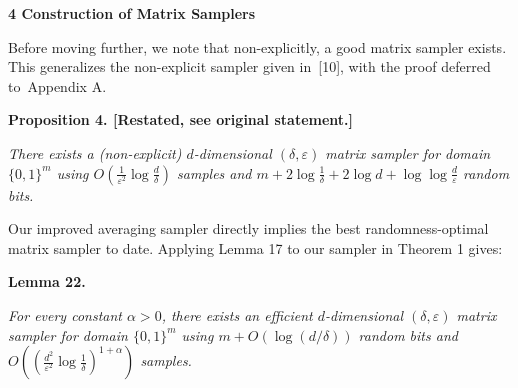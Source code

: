 \documentclass[10pt,a4paper]{article}
\begin{document}






\par\medskip\noindent\textbf{
4 Construction of Matrix Samplers}\par




Before moving further, we note that non-explicitly,
a good matrix sampler exists.
This generalizes the non-explicit sampler given in [10], with the proof deferred to Appendix A.\par






\par\medskip\noindent\textbf{
\textbf{Proposition 4}\textbf{.}
[Restated, see original statement.]}\par



\emph{There exists a (non-explicit) $d$-dimensional $(\delta,\varepsilon)$ matrix sampler for domain $\{0,1\}^{m}$ using $O(\frac{1}{\varepsilon^{2}}\log\frac{d}{\delta})$ samples and $m+2\log\frac{1}{\delta}+2\log d+\log\log\frac{d}{\varepsilon}$ random bits.}\par







Our improved averaging sampler directly implies the best randomness-optimal matrix sampler to date.
Applying Lemma 17 to our sampler in Theorem 1 gives:\par





\par\medskip\noindent\textbf{
\textbf{Lemma 22}\textbf{.}
}\par



\emph{For every constant $\alpha>0$, there exists an efficient $d$-dimensional $(\delta,\varepsilon)$ matrix sampler for domain $\{0,1\}^{m}$ using $m+O(\log(d/\delta))$ random bits and $O((\frac{d^{2}}{\varepsilon^{2}}\log\frac{1}{\delta})^{1+\alpha})$ samples.}\par



\end{document}
